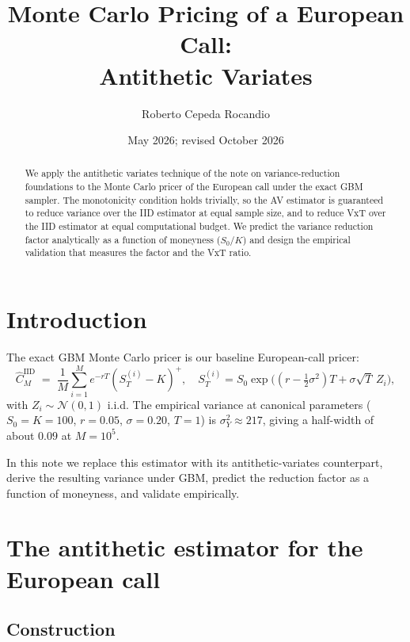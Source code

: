 \documentclass[11pt,a4paper]{article}
\title{Monte Carlo Pricing of a European Call:\\
       Antithetic Variates}
\author{Roberto Cepeda Rocandio}
\date{May 2026; revised October 2026}
\theoremstyle{plain}
\theoremstyle{definition}
\theoremstyle{remark}
\begin{document}
\maketitle

\begin{abstract}
We apply the antithetic variates technique of the note on
variance-reduction foundations
to the Monte Carlo pricer of the European call under the exact GBM
sampler. The monotonicity condition holds trivially, so
the AV estimator is guaranteed to reduce variance over the IID
estimator at equal sample size, and to reduce VxT over the IID
estimator at equal computational budget. We predict the variance
reduction factor analytically as a function of moneyness ($S_0/K$)
and design the empirical validation that measures the factor and the
VxT ratio.
\end{abstract}

\tableofcontents

\section{Introduction}
\label{sec:intro}

The exact GBM Monte Carlo pricer is our baseline European-call pricer:
\begin{equation}
\hat C_M^{\mathrm{IID}} \;=\; \frac{1}{M} \sum_{i=1}^M
e^{-rT} (S_T^{(i)} - K)^+,
\quad
S_T^{(i)} = S_0 \exp\!\bigl((r - \tfrac{1}{2}\sigma^2)T + \sigma \sqrt T\, Z_i\bigr),
\end{equation}
with $Z_i \sim \mathcal{N}(0, 1)$ i.i.d. The empirical variance at
canonical parameters ($S_0 = K = 100$, $r = 0.05$, $\sigma = 0.20$,
$T = 1$) is $\sigma^2_Y \approx 217$, giving a half-width of about
$0.09$ at $M = 10^5$.

In this note we replace this estimator with its antithetic-variates
counterpart, derive the resulting variance under GBM, predict the
reduction factor as a function of moneyness, and validate empirically.

\section{The antithetic estimator for the European call}
\label{sec:av-call}

\subsection{Construction}
\end{document}
